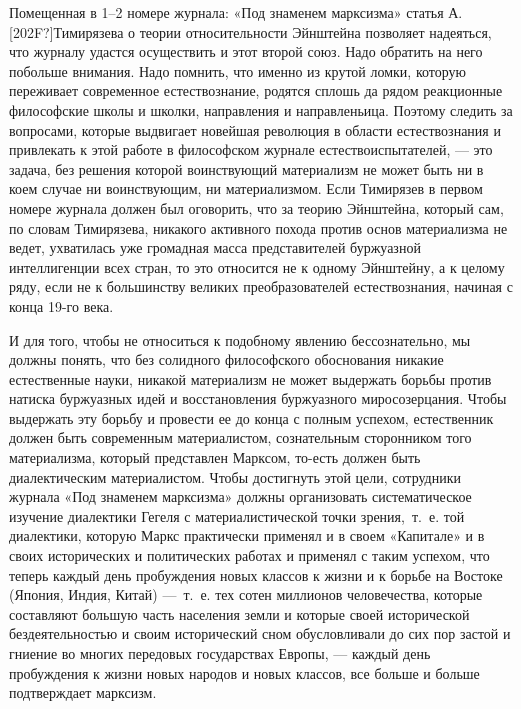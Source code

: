 \documentclass[twoside]{article}
\begin{document}
Помещенная в 1–2 номере журнала: «Под знаменем марксизма» статья
А.\textlatin{[202F?]}Тимирязева о теории относительности Эйнштейна
позволяет надеяться, что журналу удастся осуществить и этот второй союз.
Надо обратить на него побольше внимания. Надо помнить, что именно из крутой
ломки, которую переживает современное естествознание, родятся сплошь да
рядом реакционные философские школы и школки, направления и направленьица.
Поэтому следить за вопросами, которые выдвигает новейшая революция в
области естествознания и привлекать к этой работе в философском журнале
естествоиспытателей, — это задача, без решения которой воинствующий
материализм не может быть ни в коем случае ни воинствующим, ни
материализмом. Если Тимирязев в первом номере журнала должен был оговорить,
что за теорию Эйнштейна, который сам, по словам Тимирязева, никакого
активного похода против основ материализма не ведет, ухватилась уже
громадная масса представителей буржуазной интеллигенции всех стран, то это
относится не к одному Эйнштейну, а к целому ряду, если не к большинству
великих преобразователей естествознания, начиная с конца 19-го века.

И для того, чтобы не относиться к подобному явлению бессознательно, мы
должны понять, что без солидного философского обоснования никакие
естественные науки, никакой материализм не может выдержать борьбы против
натиска буржуазных идей и восстановления буржуазного миросозерцания. Чтобы
выдержать эту борьбу и провести ее до конца с полным успехом, естественник
должен быть современным материалистом, сознательным сторонником того
материализма, который представлен Марксом, то-есть должен быть
диалектическим материалистом. Чтобы достигнуть этой цели, сотрудники
журнала «Под знаменем марксизма» должны организовать систематическое
изучение диалектики Гегеля с материалистической точки зрения,~т.~е. той
диалектики, которую Маркс практически применял и в своем «Капитале» и в
своих исторических и политических работах и применял с таким успехом, что
теперь каждый день пробуждения новых классов к жизни и к борьбе на Востоке
(Япония, Индия, Китай) —~т.~е. тех сотен миллионов человечества, которые
составляют большую часть населения земли и которые своей исторической
бездеятельностью и своим исторический сном обусловливали до сих пор застой
и гниение во многих передовых государствах Европы, — каждый день
пробуждения к жизни новых народов и новых классов, все больше и больше
подтверждает марксизм.
\end{document}
